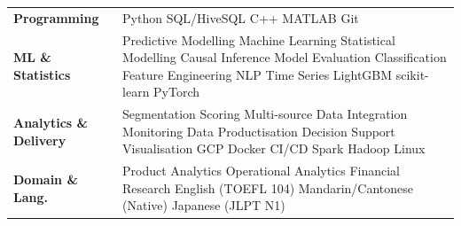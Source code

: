 \documentclass[a4paper,10pt]{article}
\begin{document}
\begin{tabular}{@{}p{3.0cm}p{12.5cm}@{}}
\textbf{Programming} & Python \textperiodcentered{} SQL/HiveSQL \textperiodcentered{} C++ \textperiodcentered{} MATLAB \textperiodcentered{} Git \\[1pt]
\textbf{ML \& Statistics} & Predictive Modelling \textperiodcentered{} Machine Learning \textperiodcentered{} Statistical Modelling \textperiodcentered{} Causal Inference \textperiodcentered{} Model Evaluation \textperiodcentered{} Classification \textperiodcentered{} Feature Engineering \textperiodcentered{} NLP \textperiodcentered{} Time Series \textperiodcentered{} LightGBM \textperiodcentered{} scikit-learn \textperiodcentered{} PyTorch \\[1pt]
\textbf{Analytics \& Delivery} & Segmentation \textperiodcentered{} Scoring \textperiodcentered{} Multi-source Data Integration \textperiodcentered{} Monitoring \textperiodcentered{} Data Productisation \textperiodcentered{} Decision Support \textperiodcentered{} Visualisation \textperiodcentered{} GCP \textperiodcentered{} Docker \textperiodcentered{} CI/CD \textperiodcentered{} Spark \textperiodcentered{} Hadoop \textperiodcentered{} Linux \\[1pt]
\textbf{Domain \& Lang.} & Product Analytics \textperiodcentered{} Operational Analytics \textperiodcentered{} Financial Research \textperiodcentered{} English (TOEFL 104) \textperiodcentered{} Mandarin/Cantonese (Native) \textperiodcentered{} Japanese (JLPT N1) \\
\end{tabular}
\end{document}
